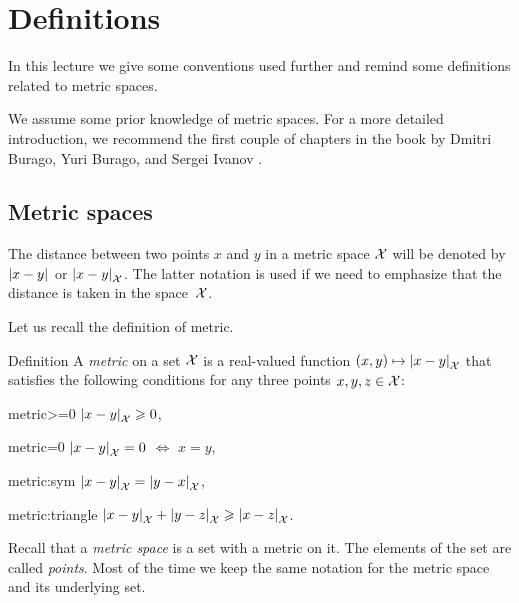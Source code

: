 \chapter{Definitions}

In this lecture we give some conventions used further
and remind some definitions related to metric spaces.

We assume some prior knowledge of metric spaces.
For a more detailed introduction, we recommend the first couple of chapters in the book by Dmitri Burago, Yuri Burago, and Sergei Ivanov \cite{burago-burago-ivanov}.

\section{Metric spaces}
\label{sec:metric spaces}

The distance between two points $x$ and $y$ in a metric space $\mathcal{X}$ will be denoted by $\dist{x}{y}{}$ or $\dist{x}{y}{\spc{X}}$.
The latter notation is used if we need to emphasize 
that the distance is taken in the space~${\mathcal{X}}$.

Let us recall the definition of metric. 

\begin{thm}{Definition}\label{def:metric}
A \emph{metric} on a set $\mathcal{X}$ is a real-valued function $(x,y)\z\mapsto\dist{x}{y}{\spc{X}}$ that satisfies the following conditions for any three points $x,y,z\in \mathcal{X}$:

\begin{subthm}{metric>=0}
$\dist{x}{y}{\spc{X}}\ge 0$,
\end{subthm}

\begin{subthm}{metric=0} $\dist{x}{y}{\spc{X}}= 0$ $\iff$ $x=y$,
\end{subthm}

\begin{subthm}{metric:sym} $\dist{x}{y}{\spc{X}}=\dist{y}{x}{\spc{X}}$,
\end{subthm}

\begin{subthm}{metric:triangle} $\dist{x}{y}{\spc{X}}+\dist{y}{z}{\spc{X}}\ge\dist{x}{z}{\spc{X}}$.
\end{subthm}

\end{thm}

Recall that a \emph{metric space} is a set with a metric on it.
The elements of the set are called \emph{points}. 
Most of the time we keep the same notation for the metric space and its underlying set.

